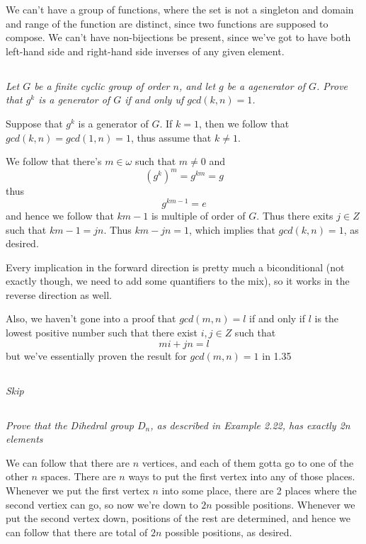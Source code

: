 \documentclass[11pt,oneside,titlepage]{book}
\begin{document}
We can't have a group of functions, where the set is not a singleton
and domain and range of the function are distinct, since two functions
are supposed to compose. We can't have non-bijections be present,
since we've got to have both left-hand side and right-hand side
inverses of any given element.

\subsection{}

\textit{Let $G$ be a finite cyclic group of order $n$, and let $g$ be
a agenerator of $G$.  Prove that $g^k$ is a generator of $G$ if and
only uf $gcd(k, n) = 1$.}

Suppose that $g^k$ is a generator of $G$. If $k = 1$, then we follow
that $gcd(k, n) = gcd(1, n) = 1$, thus assume that $k \neq 1$.

We follow that there's $m \in \omega$ such that $m \neq 0$ and
$$(g^k)^m = g^{km} = g$$
thus
$$g^{km - 1}  = e$$
and hence we follow that $km - 1$ is multiple of order of $G$.  Thus
there exits $j \in Z$ such that $km - 1 = jn$.  Thus $km - jn = 1$,
which implies that $gcd(k, n) = 1$, as desired.

Every implication in the forward direction is pretty much a
biconditional (not exactly though, we need to add some quantifiers to
the mix), so it works in the reverse direction as well.

Also, we haven't gone into a proof that $gcd(m, n) = l$ if and only if
$l$ is the lowest positive number such that there exist $i, j \in Z$
such that
$$mi + jn = l$$
but we've essentially proven the result for $gcd(m, n) = 1$ in 1.35

\subsection{}

\textit{Skip}

\subsection{}

\textit{Prove that the Dihedral group $D_n$, as described in Example
2.22, has exactly 2n elements}

We can follow that there are $n$ vertices, and each of them gotta go
to one of the other $n$ spaces. There are $n$ ways to put the first
vertex into any of those places. Whenever we put the first vertex $n$
into some place, there are 2 places where the second vertiex can go,
so now we're down to $2n$ possible positions. Whenever we put the
second vertex down, positions of the rest are determined, and hence we
can follow that there are total of $2n$ possible positions, as
desired.
\end{document}
